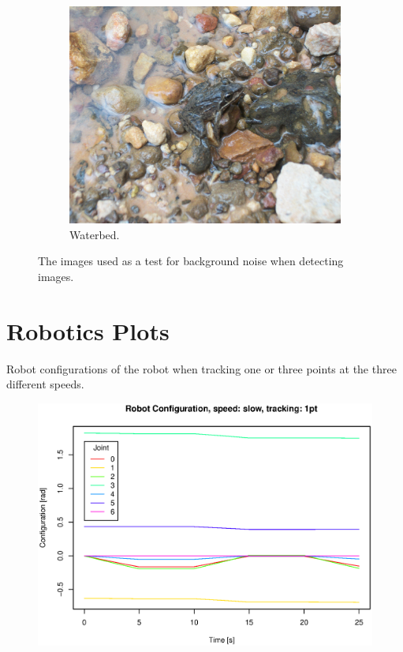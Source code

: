 \begin{figure}
  \begin{subfigure}{0.49\linewidth}    \includegraphics[width=\linewidth]{graphics/texture3} \caption{Waterbed.}         \label{fig:scene_waterb} \end{subfigure}
  \caption{The images used as a test for background noise when detecting images.}
  \label{fig:backgrounds}
\end{figure}

\section{Robotics Plots}
\label{app:roboticsPlots}

Robot configurations of the robot when tracking one or three points at the three different speeds.
\begin{figure}[H]
\centering
\includegraphics[width= \linewidth]{graphics/robotics/robotConfiguration_slow_1pt}
\caption{}
\label{fig:}
\end{figure}

